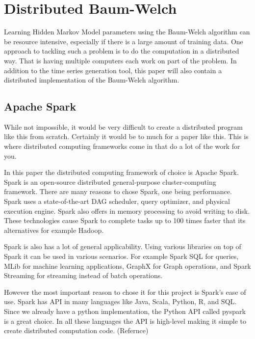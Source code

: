 
\chapter{Distributed Baum-Welch}\label{chapter:hmm-dist}

Learning Hidden Markov Model parameters using the Baum-Welch algorithm can be resource intensive, especially if there is a large amount of training data. One approach to tackling such a problem is to do the computation in a distributed way. That is having multiple computers each work on part of the problem. In addition to the time series generation tool, this paper will also contain a distributed implementation of the Baum-Welch algorithm. 

\section{Apache Spark}

While not impossible, it would be very difficult to create a distributed program like this from scratch. Certainly it would be to much for a paper like this. This is where distributed computing frameworks come in that do a lot of the work for you. 

In this paper the distributed computing framework of choice is Apache Spark. Spark is an open-source distributed general-purpose cluster-computing framework. There are many reasons to chose Spark, one being performance. Spark uses a state-of-the-art DAG scheduler, query optimizer, and physical execution engine. Spark also offers in memory processing to avoid writing to disk. These technologies cause Spark to complete tasks up to 100 times faster that its alternatives for example Hadoop. 

Spark is also has a lot of general applicability. Using various libraries on top of Spark it can be used in various scenarios. For example Spark SQL for queries, MLib for machine learning applications, GraphX for Graph operations, and Spark Streaming for streaming instead of batch operations. 

However the most important reason to chose it for this project is Spark's ease of use. Spark has API in many languages like Java, Scala, Python, R, and SQL. Since we already have a python implementation, the Python API called pyspark is a great choice. In all these languages the API is high-level making it simple to create distributed computation code. (Refernce)

